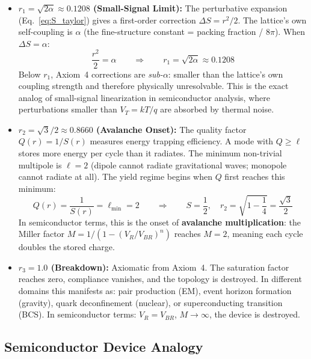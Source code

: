 \begin{itemize}
    \item \textbf{$r_1 = \sqrt{2\alpha} \approx 0.1208$ (Small-Signal Limit):} The perturbative expansion (Eq.~\ref{eq:S_taylor}) gives a first-order correction $\Delta S = r^2/2$. The lattice's own self-coupling is $\alpha$ (the fine-structure constant = packing fraction / $8\pi$). When $\Delta S = \alpha$:
    \begin{equation}
        \frac{r^2}{2} = \alpha \qquad \Longrightarrow \qquad r_1 = \sqrt{2\alpha} \approx 0.1208
    \end{equation}
    Below $r_1$, Axiom~4 corrections are \textit{sub-$\alpha$}: smaller than the lattice's own coupling strength and therefore physically unresolvable. This is the exact analog of small-signal linearization in semiconductor analysis, where perturbations smaller than $V_T = kT/q$ are absorbed by thermal noise.

    \item \textbf{$r_2 = \sqrt{3}/2 \approx 0.8660$ (Avalanche Onset):} The quality factor $Q(r) = 1/S(r)$ measures energy trapping efficiency. A mode with $Q \geq \ell$ stores more energy per cycle than it radiates. The minimum non-trivial multipole is $\ell = 2$ (dipole cannot radiate gravitational waves; monopole cannot radiate at all). The yield regime begins when $Q$ first reaches this minimum:
    \begin{equation}
        Q(r) = \frac{1}{S(r)} = \ell_{\min} = 2 \qquad \Longrightarrow \qquad S = \frac{1}{2}, \quad r_2 = \sqrt{1 - \frac{1}{4}} = \frac{\sqrt{3}}{2}
    \end{equation}
    In semiconductor terms, this is the onset of \textbf{avalanche multiplication}: the Miller factor $M = 1/(1-(V_R/V_{BR})^n)$ reaches $M = 2$, meaning each cycle doubles the stored charge.

    \item \textbf{$r_3 = 1.0$ (Breakdown):} Axiomatic from Axiom~4. The saturation factor reaches zero, compliance vanishes, and the topology is destroyed. In different domains this manifests as: pair production (EM), event horizon formation (gravity), quark deconfinement (nuclear), or superconducting transition (BCS). In semiconductor terms: $V_R = V_{BR}$, $M \to \infty$, the device is destroyed.
\end{itemize}

\subsection{Semiconductor Device Analogy}

